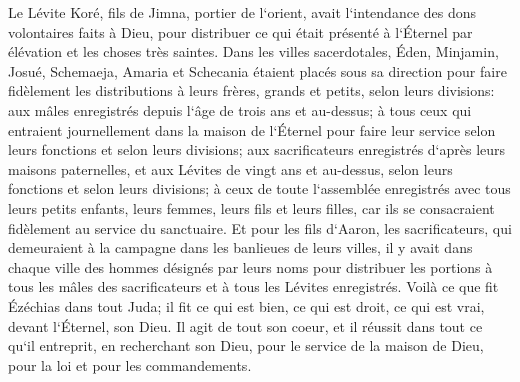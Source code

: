 \verse Le Lévite Koré, fils de Jimna, portier de l`orient, avait l`intendance des dons volontaires faits à Dieu, pour distribuer ce qui était présenté à l`Éternel par élévation et les choses très saintes. 
\verse Dans les villes sacerdotales, Éden, Minjamin, Josué, Schemaeja, Amaria et Schecania étaient placés sous sa direction pour faire fidèlement les distributions à leurs frères, grands et petits, selon leurs divisions: 
\verse aux mâles enregistrés depuis l`âge de trois ans et au-dessus; à tous ceux qui entraient journellement dans la maison de l`Éternel pour faire leur service selon leurs fonctions et selon leurs divisions; 
\verse aux sacrificateurs enregistrés d`après leurs maisons paternelles, et aux Lévites de vingt ans et au-dessus, selon leurs fonctions et selon leurs divisions; 
\verse à ceux de toute l`assemblée enregistrés avec tous leurs petits enfants, leurs femmes, leurs fils et leurs filles, car ils se consacraient fidèlement au service du sanctuaire. 
\verse Et pour les fils d`Aaron, les sacrificateurs, qui demeuraient à la campagne dans les banlieues de leurs villes, il y avait dans chaque ville des hommes désignés par leurs noms pour distribuer les portions à tous les mâles des sacrificateurs et à tous les Lévites enregistrés. 
\verse Voilà ce que fit Ézéchias dans tout Juda; il fit ce qui est bien, ce qui est droit, ce qui est vrai, devant l`Éternel, son Dieu. 
\verse Il agit de tout son coeur, et il réussit dans tout ce qu`il entreprit, en recherchant son Dieu, pour le service de la maison de Dieu, pour la loi et pour les commandements. 

